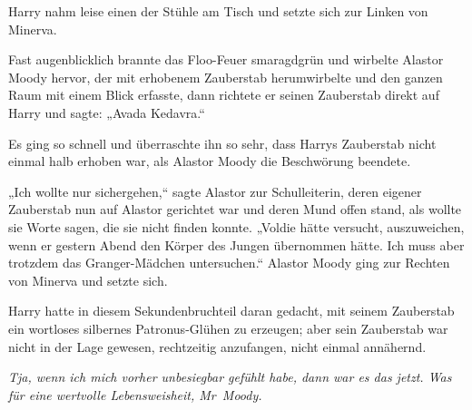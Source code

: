 Harry nahm leise einen der Stühle am Tisch und setzte sich zur Linken von Minerva.

Fast augenblicklich brannte das Floo-Feuer smaragdgrün und wirbelte Alastor Moody hervor, der mit erhobenem Zauberstab herumwirbelte und den ganzen Raum mit einem Blick erfasste, dann richtete er seinen Zauberstab direkt auf Harry und sagte: „Avada Kedavra.“

Es ging so schnell und überraschte ihn so sehr, dass Harrys Zauberstab nicht einmal halb erhoben war, als Alastor Moody die Beschwörung beendete.

„Ich wollte nur sichergehen,“ sagte Alastor zur Schulleiterin, deren eigener Zauberstab nun auf Alastor gerichtet war und deren Mund offen stand, als wollte sie Worte sagen, die sie nicht finden konnte.
„Voldie hätte versucht, auszuweichen, wenn er gestern Abend den Körper des Jungen übernommen hätte. Ich muss aber trotzdem das Granger-Mädchen untersuchen.“
Alastor Moody ging zur Rechten von Minerva und setzte sich.

Harry hatte in diesem Sekundenbruchteil daran gedacht, mit seinem Zauberstab ein wortloses silbernes Patronus-Glühen zu erzeugen; aber sein Zauberstab war nicht in der Lage gewesen, rechtzeitig anzufangen, nicht einmal annähernd.

\emph{Tja, wenn ich mich vorher unbesiegbar gefühlt habe, dann war es das jetzt. Was für eine wertvolle Lebensweisheit, Mr~Moody.}

